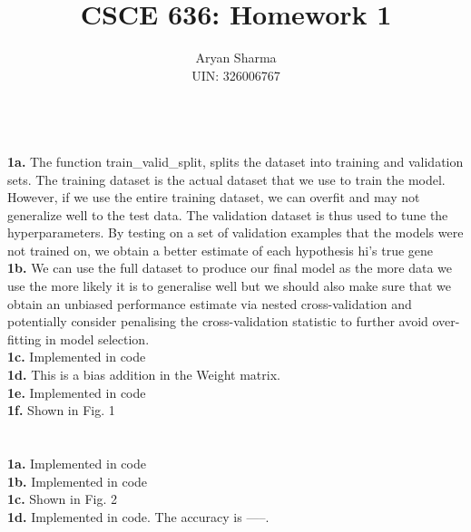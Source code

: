 \documentclass[letterpaper]{article}
\title{CSCE 636: Homework 1}
\author{Aryan Sharma\\UIN: 326006767} %
\date{} %
\begin{document}
	
\maketitle

\\

\noindent \textbf{1a.} The function train\_valid\_split, splits the dataset into training and validation sets. The training dataset is the actual dataset that we use to train the model. However, if we use the entire training dataset, we can overfit and may not generalize well to the test data. The validation dataset is thus used to tune the hyperparameters. By testing on a set of validation examples that the models were not trained on, we obtain a better estimate of each hypothesis hi’s true gene\\

\noindent \textbf{1b.} We can use the full dataset to produce our final model as the more data we use the more likely it is to generalise well but we should also make sure that we obtain an unbiased performance estimate via nested cross-validation and potentially consider penalising the cross-validation statistic to further avoid over-fitting in model selection.\\

\noindent \textbf{1c.} Implemented in code\\

\noindent \textbf{1d.} This is a bias addition in the Weight matrix.\\

\noindent \textbf{1e.} Implemented in code\\

\noindent \textbf{1f.} Shown in Fig. 1\\\\

\\

\noindent \textbf{1a.} Implemented in code\\

\noindent \textbf{1b.} Implemented in code\\

\noindent \textbf{1c.} Shown in Fig. 2\\

\noindent \textbf{1d.} Implemented in code. The accuracy is -----.\\\\
\end{document}
